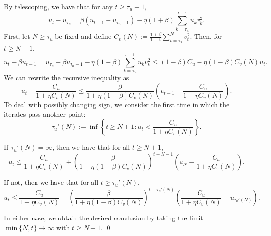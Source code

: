 By telescoping, we have that for any $t \geq \tau_u + 1$,
\begin{equation*}
    u_t - u_{\tau_u} = \beta (u_{t-1} - u_{\tau_u - 1}) - \eta(1 + \beta) \sum_{k = \tau_u}^{t-1} u_k v_k^2.
\end{equation*}
First, let $N \geq \tau_u$ be fixed and define $C_v(N) := \frac{1 + \beta}{1 - \beta} \sum_{t = \tau_u}^N v_t^2.$
Then, for $t \geq N + 1$,
\begin{equation*}
    u_t - \beta u_{t-1} = u_{\tau_u}- \beta u_{\tau_u - 1} - \eta(1 + \beta) \sum_{k = \tau_u}^{t-1} u_k v_k^2
    \leq (1 - \beta) C_u - \eta (1 - \beta) C_v(N) u_t.
\end{equation*}
We can rewrite the recursive inequality as
\begin{equation*}
    u_t - \frac{C_u}{1 + \eta C_v(N)} \leq \frac{\beta}{1 + \eta (1-\beta) C_v(N)} \left( u_{t-1} - \frac{C_u}{1 + \eta C_v(N)} \right).
\end{equation*}
To deal with possibly changing sign, we consider the first time in which the iterates pass another point:
\begin{equation}
    \tau_u'(N) := \inf\left\{ t \geq N + 1 : u_t < \frac{C_u}{1 + \eta C_v(N)} \right\}.
\end{equation}

If $\tau_u'(N) = \infty$, then we have that for all $t \geq N + 1$,
\begin{equation}
    u_t \leq \frac{C_u}{1 + \eta C_v(N)} + \left( \frac{\beta}{1 + \eta (1-\beta) C_v(N)} \right)^{t - N - 1} \left( u_N - \frac{C_u}{1 + \eta C_v(N)} \right).
\end{equation}

If not, then we have that for all $t \geq \tau_u'(N)$,
\begin{equation}
    u_t \leq \frac{C_u}{1 + \eta C_v(N)} - \left( \frac{\beta}{1 + \eta (1-\beta) C_v(N)} \right)^{t - \tau_u'(N)} \left( \frac{C_u}{1 + \eta C_v(N)} - u_{\tau_u'(N)} \right),
\end{equation}

In either case, we obtain the desired conclusion by taking the limit $\min\{N, t\} \rightarrow \infty$ with $t \geq N + 1$.
\qed









